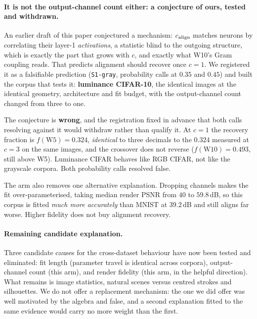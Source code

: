 \paragraph{It is not the output-channel count either: a conjecture of ours, tested and withdrawn.} An earlier draft of this paper conjectured a mechanism: $c_{\mathrm{align}}$ matches neurons by
correlating their layer-1 \emph{activations}, a statistic blind to the outgoing structure, which is exactly the part that grows with $c$, and exactly what W10's Gram coupling reads. That predicts
alignment should recover once $c=1$. We registered it as a falsifiable prediction
(\texttt{S1-gray}, probability calls at $0.35$ and $0.45$) and built the corpus that tests it:
\textbf{luminance CIFAR-10}, the identical images at the identical geometry, architecture and fit
budget, with the output-channel count changed from three to one.



The conjecture is \textbf{wrong}, and the registration fixed in advance that both calls resolving
against it would withdraw rather than qualify it. At $c=1$ the recovery fraction is $f(\mathrm{W5}) = 0.324$, \emph{identical} to three decimals to the $0.324$ measured at $c=3$ on the same images, and the crossover does not reverse ($f(\mathrm{W10}) = 0.493$, still above W5). Luminance CIFAR behaves like
RGB CIFAR, not like the grayscale corpora. Both probability calls resolved false.

The arm also removes one alternative explanation. Dropping channels makes the fit
over-parameterised, taking median render PSNR from $40$ to $59.8$\,dB, so this corpus is fitted
\emph{much more accurately} than MNIST at $39.2$\,dB and still aligns far worse. Higher fidelity
does not buy alignment recovery.

\paragraph{Remaining candidate explanation.} Three candidate causes for the cross-dataset behaviour have now been
tested and eliminated: fit length (parameter travel is identical across corpora), output-channel
count (this arm), and render fidelity (this arm, in the helpful direction). What remains is image statistics, natural scenes versus centred strokes and silhouettes. We do not offer a replacement
mechanism: the one we did offer was well motivated by the algebra and false, and a second
explanation fitted to the same evidence would carry no more weight than the first.

